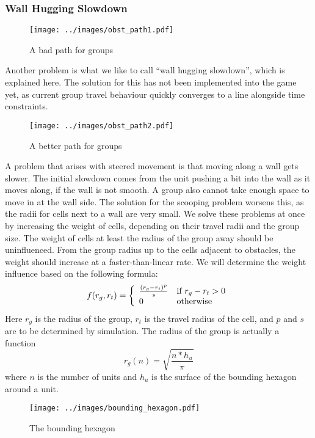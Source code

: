 \subsubsection{Wall Hugging Slowdown}
\label{sec:extra_weight}
\begin{wrapfigure}{r}{0.30\textwidth}
\texttt{[image: ../images/obst\_path1.pdf]}
\caption{A bad path for groups}
\end{wrapfigure} 
Another problem is what we like to call ``wall hugging slowdown'', which is explained here. The solution for this has not been implemented into the game yet, as current group travel behaviour quickly converges to a line alongside time constraints.
\begin{wrapfigure}{r}{0.30\textwidth}
\texttt{[image: ../images/obst\_path2.pdf]}
\caption{A better path for groups}
\end{wrapfigure} 

A problem that arises with steered movement is that moving along a wall gets slower. The initial slowdown comes from the unit pushing a bit into the wall as it moves along, if the wall is not smooth. A group also cannot take enough space to move in at the wall side. The solution for the scooping problem worsens this, as the radii for cells next to a wall are very small. We solve these problems at once by increasing the weight of cells, depending on their travel radii and the group size. The weight of cells at least the radius of the group away should be uninfluenced. From the group radius up to the cells adjacent to obstacles, the weight should increase at a faster-than-linear rate. We will determine the weight influence based on the following formula:
$$f(r_g, r_t) = \left\{\begin{array}{l l}
					\frac{(r_g - r_t)^p}{s} & \text{if } r_g - r_t > 0\\
					0 & \text{otherwise}
                \end{array}\right.
                $$
Here $r_g$ is the radius of the group, $r_t$ is the travel radius of the cell, and $p$ and $s$ are to be determined by simulation. The radius of the group is actually a function $$r_g(n) = \sqrt{\frac{n * h_u}{\pi}}$$ where $n$ is the number of units and $h_u$ is the surface of the bounding hexagon around a unit.
\begin{wrapfigure}{r}{0.30\textwidth}
\texttt{[image: ../images/bounding\_hexagon.pdf]}
\caption{The bounding hexagon}
\end{wrapfigure} 

